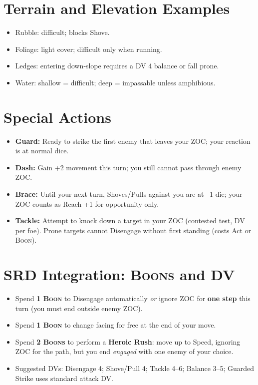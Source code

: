 \documentclass[11pt]{article}
\newcommand{\Boon}{\textsc{Boon}}
\newcommand{\Boons}{\textsc{Boons}}
\newcommand{\DV}{\textsc{DV}}
\begin{document}
\section{Terrain and Elevation Examples}
\begin{itemize}
  \item Rubble: difficult; blocks Shove.
  \item Foliage: light cover; difficult only when running.
  \item Ledges: entering down‑slope requires a \DV{} 4 balance or fall prone.
  \item Water: shallow = difficult; deep = impassable unless amphibious.
\end{itemize}

\section{Special Actions}
\begin{itemize}
  \item \textbf{Guard:} Ready to strike the first enemy that leaves your ZOC; your reaction is at normal dice.
  \item \textbf{Dash:} Gain +2 movement this turn; you still cannot pass through enemy ZOC.
  \item \textbf{Brace:} Until your next turn, Shoves/Pulls against you are at –1 die; your ZOC counts as Reach +1 for opportunity only.
  \item \textbf{Tackle:} Attempt to knock down a target in your ZOC (contested test, \DV{} per foe). Prone targets cannot Disengage without first standing (costs Act or \Boon{}).
\end{itemize}

\section{SRD Integration: \Boons{} and \DV{}}
\begin{itemize}
  \item Spend \textbf{1 \Boon} to Disengage automatically \emph{or} ignore ZOC for \textbf{one step} this turn (you must end outside enemy ZOC).
  \item Spend \textbf{1 \Boon} to change facing for free at the end of your move.
  \item Spend \textbf{2 \Boons} to perform a \textbf{Heroic Rush}: move up to Speed, ignoring ZOC for the path, but you end \emph{engaged} with one enemy of your choice.
  \item Suggested \DV{}s: Disengage 4; Shove/Pull 4; Tackle 4–6; Balance 3–5; Guarded Strike uses standard attack \DV{}.
\end{itemize}
\end{document}
